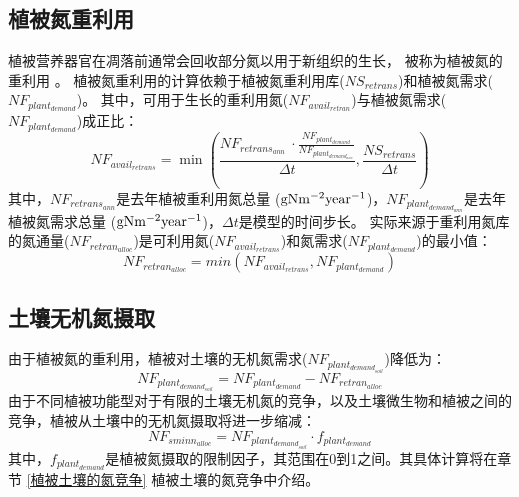 \subsection{植被氮重利用}\label{植被氮重利用}
植被营养器官在凋落前通常会回收部分氮以用于新组织的生长，
被称为植被氮的重利用 \citep{magill1997biogeochemical,oikawa2005dynamics,son1991aboveground}。
植被氮重利用的计算依赖于植被氮重利用库($NS_{retrans}$)和植被氮需求($NF_{plant_{demand}}$)。
其中，可用于生长的重利用氮($NF_{avail_{retran}}$)与植被氮需求($NF_{plant_{demand}}$)成正比：
\begin{equation}
NF_{avail_{retrans}}=\min{\left(\frac{NF_{retrans_{ann}}\ \cdot \frac{NF_{plant_{demand}}}{NF_{plant_{demand_{ann}}}}}{{\Delta t}},\frac{NS_{retrans}}{{\Delta t}}\right)}
\end{equation}
其中，$NF_{retrans_{ann}}$是去年植被重利用氮总量 ($\rm g N m^{-2} year^{-1}$)，$NF_{plant_{demand_{ann}}}$是去年植被氮需求总量 ($\rm g N m^{-2} year^{-1}$)，${\Delta t}$是模型的时间步长。
实际来源于重利用氮库的氮通量($NF_{retran_{alloc}}$)是可利用氮($NF_{avail_{retrans}}$)和氮需求($NF_{plant_{demand}}$)的最小值：
\begin{equation}\label{NF_retran_alloc}
  NF_{retran_{alloc}}=min{\left(NF_{avail_{retrans}},NF_{plant_{demand}}\right)}
\end{equation}



\subsection{土壤无机氮摄取}\label{土壤无机氮摄取}
由于植被氮的重利用，植被对土壤的无机氮需求($NF_{plant_{demand_{soil}}}$)降低为：
\begin{equation}\label{NF_plant_demand_soil}
  NF_{plant_{demand_{soil}}}=NF_{plant_{demand}}-NF_{retran_{alloc}}	       
\end{equation}
由于不同植被功能型对于有限的土壤无机氮的竞争，以及土壤微生物和植被之间的竞争，植被从土壤中的无机氮摄取将进一步缩减：
\begin{equation}\label{NF_sminn_alloc}
NF_{sminn_{alloc}}=NF_{plant_{demand_{soil}}}\cdot f_{plant_{demand}}
\end{equation}
其中，$f_{plant_{demand}}$是植被氮摄取的限制因子，其范围在0到1之间。其具体计算将在章节 \ref{植被土壤的氮竞争} 植被土壤的氮竞争中介绍。




